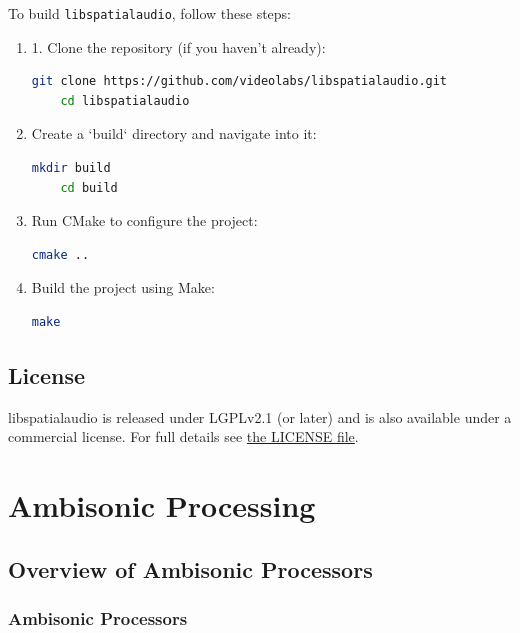 \documentclass[12pt]{report}
\def\libspataud{\texttt{libspatialaudio}\xspace}
\begin{document}
To build \libspataud, follow these steps:
\begin{enumerate}
    \item 1. Clone the repository (if you haven't already):
\begin{lstlisting}[language=bash]
    git clone https://github.com/videolabs/libspatialaudio.git
    cd libspatialaudio
\end{lstlisting}
\item  Create a `build` directory and navigate into it:
\begin{lstlisting}[language=bash]
    mkdir build
    cd build
\end{lstlisting}
\item Run CMake to configure the project:
\begin{lstlisting}[language=bash]
    cmake ..
\end{lstlisting}
\item Build the project using Make:
\begin{lstlisting}[language=bash]
    make
\end{lstlisting}
\end{enumerate}

\section{License}

libspatialaudio is released under LGPLv2.1 (or later) and is also available
under a commercial license. For full details see \href{https://github.com/videolabs/libspatialaudio/blob/master/LICENSE}{the LICENSE file}.

\chapter{Ambisonic Processing}\label{Ambisonics}

\section{Overview of Ambisonic Processors}\label{AmbisonicOverview}

\subsection{Ambisonic Processors}
\end{document}
